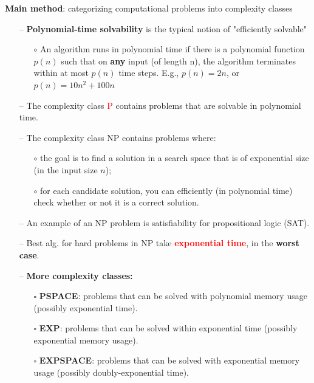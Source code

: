 \textbf{Main method}: categorizing computational problems into \textcolor{PineGreen}{complexity classes}

\begin{itemize}
    \item[--] \textbf{\textcolor{PineGreen}{Polynomial-time solvability}} is the typical notion of "efficiently solvable"
    \begin{itemize}
        \item[$\circ$] An algorithm runs in polynomial time if there is a polynomial function $p(n)$ such that on \textbf{any} input (of length n), the algorithm terminates within at most $p(n)$ time steps. E.g., $p(n) = 2n$, or $p(n) = 10n^2 + 100n$ 
    \end{itemize}
    \item[--] The complexity class \textcolor{red}{P} contains problems that are solvable in polynomial time.
    \item[--] The complexity class \textcolor{NavyBlue}{NP} contains problems where:
    \begin{itemize}
        \item[$\circ$] the goal is to find a solution in a search space that is of exponential size (in the input size $n$);
        \item[$\circ$] for each candidate solution, you can efficiently (in polynomial time) check whether or not it is a correct solution.
    \end{itemize}
    \item[--] An example of an NP problem is \textcolor{PineGreen}{satisfiability for propositional logic (SAT)}.
    \item[--] Best alg. for hard problems in NP take \textbf{\textcolor{red}{exponential time}}, in the \textbf{worst case}.
    \item[--] \textbf{More complexity classes:}
    \begin{itemize}
        \item[$\square$] \textbf{PSPACE}: problems that can be solved with polynomial memory usage (possibly exponential time).
        \item[$\square$] \textbf{EXP}: problems that can be solved within exponential time (possibly exponential memory usage).
        \item[$\square$] \textbf{EXPSPACE}: problems that can be solved with exponential memory usage (possibly doubly-exponential time).
    \end{itemize}
\end{itemize}

